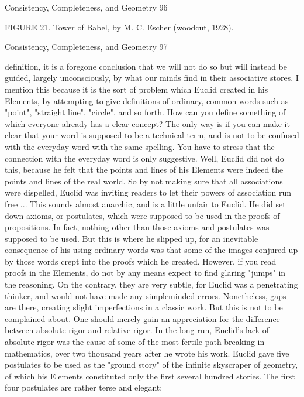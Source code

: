 Consistency, Completeness, and Geometry                                                       96

      FIGURE 21. Tower of Babel, by M. C. Escher (woodcut, 1928).




Consistency, Completeness, and Geometry                             97

definition, it is a foregone conclusion that we will not do so but will instead be guided,
largely unconsciously, by what our minds find in their associative stores. I mention this
because it is the sort of problem which Euclid created in his Elements, by attempting to
give definitions of ordinary, common words such as "point", "straight line", "circle", and
so forth. How can you define something of which everyone already has a clear concept?
The only way is if you can make it clear that your word is supposed to be a technical
term, and is not to be confused with the everyday word with the same spelling. You have
to stress that the connection with the everyday word is only suggestive. Well, Euclid did
not do this, because he felt that the points and lines of his Elements were indeed the
points and lines of the real world. So by not making sure that all associations were
dispelled, Euclid was inviting readers to let their powers of association run free ...
         This sounds almost anarchic, and is a little unfair to Euclid. He did set down
axioms, or postulates, which were supposed to be used in the proofs of propositions. In
fact, nothing other than those axioms and postulates was supposed to be used. But this is
where he slipped up, for an inevitable consequence of his using ordinary words was that
some of the images conjured up by those words crept into the proofs which he created.
However, if you read proofs in the Elements, do not by any means expect to find glaring
"jumps" in the reasoning. On the contrary, they are very subtle, for Euclid was a
penetrating thinker, and would not have made any simpleminded errors. Nonetheless,
gaps are there, creating slight imperfections in a classic work. But this is not to be
complained about. One should merely gain an appreciation for the difference between
absolute rigor and relative rigor. In the long run, Euclid's lack of absolute rigor was the
cause of some of the most fertile path-breaking in mathematics, over two thousand years
after he wrote his work.
         Euclid gave five postulates to be used as the "ground story" of the infinite
skyscraper of geometry, of which his Elements constituted only the first several hundred
stories. The first four postulates are rather terse and elegant:

